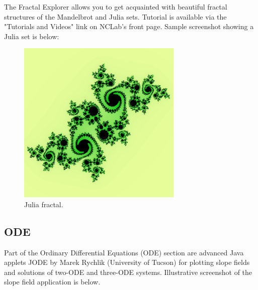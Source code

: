 \documentclass{article}
\begin{document}
The Fractal Explorer allows you to get acquainted with beautiful 
fractal structures of the Mandelbrot and Julia sets. Tutorial 
is available via the "Tutorials and Videos" link on NCLab's front page. 
Sample screenshot showing a Julia set is below:

\begin{figure}[!ht]
\begin{center}
\includegraphics[width=0.7\textwidth]{img/julia.png}
\end{center}
\caption{Julia fractal.}
\label{fig:julia}
\end{figure}




\subsection{ODE}

Part of the Ordinary Differential Equations (ODE) section are advanced Java applets JODE by Marek 
Rychlik (University of Tucson) for plotting slope fields and solutions 
of two-ODE and three-ODE systems. Illustrative screenshot of the slope 
field application is below.

\newpage
\end{document}
